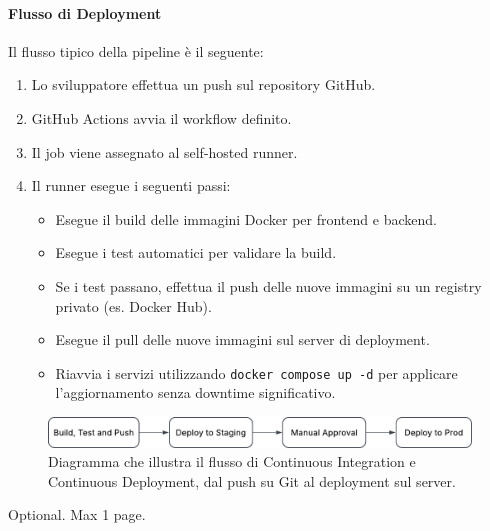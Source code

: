 \documentclass[12pt,a4paper,openright,twoside]{book}
\begin{document}
\paragraph{Flusso di Deployment} Il flusso tipico della pipeline è il seguente:
\begin{enumerate}
    \item Lo sviluppatore effettua un push sul repository GitHub.
    \item GitHub Actions avvia il workflow definito.
    \item Il job viene assegnato al self-hosted runner.
    \item Il runner esegue i seguenti passi:
          \begin{itemize}
              \item Esegue il build delle immagini Docker per frontend e backend.
              \item Esegue i test automatici per validare la build.
              \item Se i test passano, effettua il push delle nuove immagini su un registry privato (es. Docker Hub).
              \item Esegue il pull delle nuove immagini sul server di deployment.
              \item Riavvia i servizi utilizzando \texttt{docker compose up -d} per applicare l'aggiornamento senza downtime significativo.
          \end{itemize}
\end{enumerate}

\begin{figure}[H]
    \centering
    \includegraphics[width=\textwidth]{figures/workflow.pdf}
    \caption{Diagramma che illustra il flusso di Continuous Integration e Continuous Deployment, dal push su Git al deployment sul server.}
    \label{fig:ci_cd_diagram}
\end{figure}


\backmatter





\begin{acknowledgements} %
    Optional. Max 1 page.
\end{acknowledgements}
\end{document}
